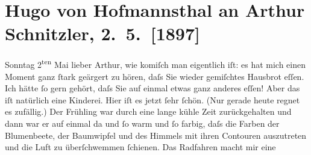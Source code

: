 

         
         \renewcommand{\erwaehntePersonen}{Personen: Marie Delna, Georg Hirschfeld, Hugo von Hofmannsthal}
         \renewcommand{\erwaehnteOrte}{Orte: Carl-Theater, Frankreich, Heiligenkreuz, Paris, Weidlingbach, Wien}
         \renewcommand{\erwaehnteWerke}{Werke: Agnes Jordan. Schauspiel in fünf Akten, Der Tod Georgs, Orpheus und Eurydike}
               \section[Hugo von Hofmannsthal an Arthur Schnitzler, 2. 5. {[}1897{]}]{ Hugo von Hofmannsthal an Arthur Schnitzler, 2. 5. {[}1897{]}}\nopagebreak{}\rehead{ }\begin{ledgroupsized}[t]{13cm}\normalsize\beginnumbering \toendnotes[C]{\smallbreak\pagebreak[2]} 
\toendnotes[C]{\smallbreak}\pstart
           \noindent{}{\pb}\textcolor{gray}{\textbf{\label{T_L00673-1v}\label{T_L00673-1h}}}\pend
           \pstart
           \raggedleft{}Sonntag 2\textsuperscript{ten} Mai\pend
           \pstart{}lieber Arthur,\pend\pstart
           wie komiſch man eigentlich iſt: es hat mich einen Moment ganz ſtark geärgert zu
               hören, daſs Sie wieder gemiſchtes Hausbrot eſſen. Ich hätte ſo gern gehört, daſs Sie
               auf einmal etwas ganz anderes eſſen! Aber das iſt natürlich eine Kinderei.\pend
           \pstart
           Hier iſt es jetzt ſehr ſchön. (Nur gerade heute regnet es zufällig.) Der Frühling war
                  {\pb}durch eine lange kühle Zeit
               zurückgehalten und dann war er auf einmal da und ſo warm und ſo farbig, daſs die
               Farben der Blumenbeete, der Baumwipfel und des Himmels mit ihren Contouren
               auszutreten und die Luft zu überſchwemmen ſchienen. Das Radfahren macht mir eine

\end{ledgroupsized}
